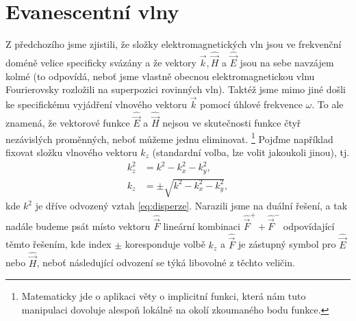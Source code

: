 \documentclass[11pt,a4paper]{article}
\begin{document}
    \section{Evanescentní vlny}
        
        Z předchozího jsme zjistili, že složky elektromagnetických vln jsou ve frekvenční doméně velice specificky svázány a že vektory $\vec k, \hat{\vec H}$ a $\hat{\vec E}$ jsou na sebe navzájem kolmé (to odpovídá, neboť jsme vlastně obecnou elektromagnetickou vlnu Fourierovsky rozložili na superpozici rovinných vln). Taktéž jsme mimo jiné došli ke specifickému vyjádření vlnového vektoru $\vec k$ pomocí úhlové frekvence $\omega$. To ale znamená, že vektorové funkce $\hat{\vec E}$ a $\hat{\vec H}$ nejsou ve skutečnosti funkce čtyř nezávislých proměnných, neboť můžeme jednu eliminovat.%
        \footnote{Matematicky jde o aplikaci věty o implicitní funkci, která nám tuto manipulaci dovoluje alespoň lokálně na okolí zkoumaného bodu funkce.}
        Pojďme například fixovat složku vlnového vektoru $k_z$ (standardní volba, lze volit jakoukoli jinou), tj.
        \begin{align*}
            k_z^2 &= k^2 - k_x^2 - k_y^2,
        \\
            k_z &= \pm \sqrt{k^2 - k_x^2 - k_y^2},
        \end{align*}
        kde $k^2$ je dříve odvozený vztah \ref{eq:disperze}. Narazili jsme na duální řešení, a tak nadále budeme psát místo vektoru $\hat{\vec F}$ lineární kombinaci $\hat{\vec F}^+ + \hat{\vec F}^-$ odpovídající těmto řešením, kde index $\pm$ koresponduje volbě $k_z$ a $\hat{\vec F}$ je zástupný symbol pro $\hat{\vec E}$ nebo $\hat{\vec H}$, neboť následující odvození se týká libovolné z těchto veličin.
\end{document}
